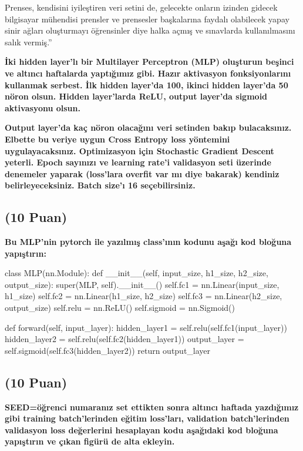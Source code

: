 \documentclass[11pt]{article}
\begin{document}
Prenses, kendisini iyileştiren veri setini de, gelecekte onların izinden gidecek bilgisayar mühendisi prensler ve prensesler başkalarına faydalı olabilecek yapay sinir ağları oluşturmayı öğrensinler diye halka açmış ve sınavlarda kullanılmasını salık vermiş.''

\textbf{İki hidden layer'lı bir Multilayer Perceptron (MLP) oluşturun beşinci ve altıncı haftalarda yaptığımız gibi. Hazır aktivasyon fonksiyonlarını kullanmak serbest. İlk hidden layer'da 100, ikinci hidden layer'da 50 nöron olsun. Hidden layer'larda ReLU, output layer'da sigmoid aktivasyonu olsun.}

\textbf{Output layer'da kaç nöron olacağını veri setinden bakıp bulacaksınız. Elbette bu veriye uygun Cross Entropy loss yöntemini uygulayacaksınız. Optimizasyon için Stochastic Gradient Descent yeterli. Epoch sayınızı ve learning rate'i validasyon seti üzerinde denemeler yaparak (loss'lara overfit var mı diye bakarak) kendiniz belirleyeceksiniz. Batch size'ı 16 seçebilirsiniz.}

\subsection{(10 Puan)} \textbf{Bu MLP'nin pytorch ile yazılmış class'ının kodunu aşağı kod bloğuna yapıştırın:}

\begin{python}
class MLP(nn.Module):
    def __init__(self, input_size, h1_size, h2_size, output_size):
        super(MLP, self).__init__()
        self.fc1 = nn.Linear(input_size, h1_size)
        self.fc2 = nn.Linear(h1_size, h2_size)
        self.fc3 = nn.Linear(h2_size, output_size)
        self.relu = nn.ReLU()
        self.sigmoid = nn.Sigmoid()

    def forward(self, input_layer):
        hidden_layer1 = self.relu(self.fc1(input_layer))
        hidden_layer2 = self.relu(self.fc2(hidden_layer1))
        output_layer = self.sigmoid(self.fc3(hidden_layer2))
        return output_layer
\end{python}

\subsection{(10 Puan)} \textbf{SEED=öğrenci numaranız set ettikten sonra altıncı haftada yazdığımız gibi training batch'lerinden eğitim loss'ları, validation batch'lerinden validasyon loss değerlerini hesaplayan kodu aşağıdaki kod bloğuna yapıştırın ve çıkan figürü de alta ekleyin.}
\end{document}
